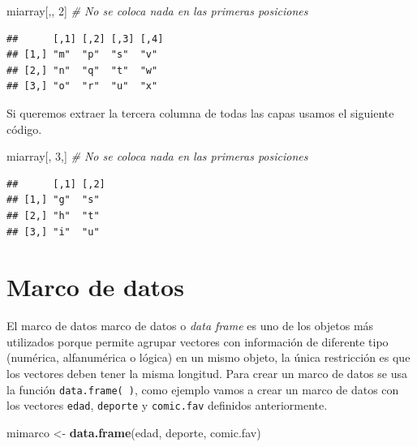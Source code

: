 \documentclass[10pt,]{krantz}
\makeatletter
\newenvironment{Shaded}{\begin{snugshade}}{\end{snugshade}}
\newcommand{\KeywordTok}[1]{\textcolor[rgb]{0.13,0.29,0.53}{\textbf{#1}}}
\newcommand{\DecValTok}[1]{\textcolor[rgb]{0.00,0.00,0.81}{#1}}
\newcommand{\StringTok}[1]{\textcolor[rgb]{0.31,0.60,0.02}{#1}}
\newcommand{\CommentTok}[1]{\textcolor[rgb]{0.56,0.35,0.01}{\textit{#1}}}
\newcommand{\NormalTok}[1]{#1}
\newenvironment{kframe}{%
\medskip{}
\setlength{\fboxsep}{.8em}
 \def\at@end@of@kframe{}%
 \ifinner\ifhmode%
  \def\at@end@of@kframe{\end{minipage}}%
  \begin{minipage}{\columnwidth}%
 \fi\fi%
 \def\FrameCommand##1{\hskip\@totalleftmargin \hskip-\fboxsep
 \colorbox{shadecolor}{##1}\hskip-\fboxsep
     \hskip-\linewidth \hskip-\@totalleftmargin \hskip\columnwidth}%
 \MakeFramed {\advance\hsize-\width
   \@totalleftmargin\z@ \linewidth\hsize
   \@setminipage}}%
 {\par\unskip\endMakeFramed%
 \at@end@of@kframe}
\renewenvironment{Shaded}{\begin{kframe}}{\end{kframe}}
\makeatother
\begin{document}
\begin{Shaded}
\begin{Highlighting}[]
\NormalTok{miarray[,, }\DecValTok{2}\NormalTok{]  }\CommentTok{# No se coloca nada en las primeras posiciones}
\end{Highlighting}
\end{Shaded}

\begin{verbatim}
##      [,1] [,2] [,3] [,4]
## [1,] "m"  "p"  "s"  "v" 
## [2,] "n"  "q"  "t"  "w" 
## [3,] "o"  "r"  "u"  "x"
\end{verbatim}

Si queremos extraer la tercera columna de todas las capas usamos el
siguiente código.

\begin{Shaded}
\begin{Highlighting}[]
\NormalTok{miarray[, }\DecValTok{3}\NormalTok{,]  }\CommentTok{# No se coloca nada en las primeras posiciones}
\end{Highlighting}
\end{Shaded}

\begin{verbatim}
##      [,1] [,2]
## [1,] "g"  "s" 
## [2,] "h"  "t" 
## [3,] "i"  "u"
\end{verbatim}

\section{\texorpdfstring{Marco de datos 
 \label{marcodatos}
\label{marcodatos}}{Marco de datos    }}\label{marco-de-datos}

El marco de datos marco de datos o \emph{data frame} es uno de los
objetos más utilizados porque permite agrupar vectores con información
de diferente tipo (numérica, alfanumérica o lógica) en un mismo objeto,
la única restricción es que los vectores deben tener la misma longitud.
Para crear un marco de datos se usa la función \texttt{data.frame(\ )},
como ejemplo vamos a crear un marco de datos con los vectores
\texttt{edad}, \texttt{deporte} y \texttt{comic.fav} definidos
anteriormente.

\begin{Shaded}
\begin{Highlighting}[]
\NormalTok{mimarco <-}\StringTok{ }\KeywordTok{data.frame}\NormalTok{(edad, deporte, comic.fav)}
\end{Highlighting}
\end{Shaded}
\end{document}
